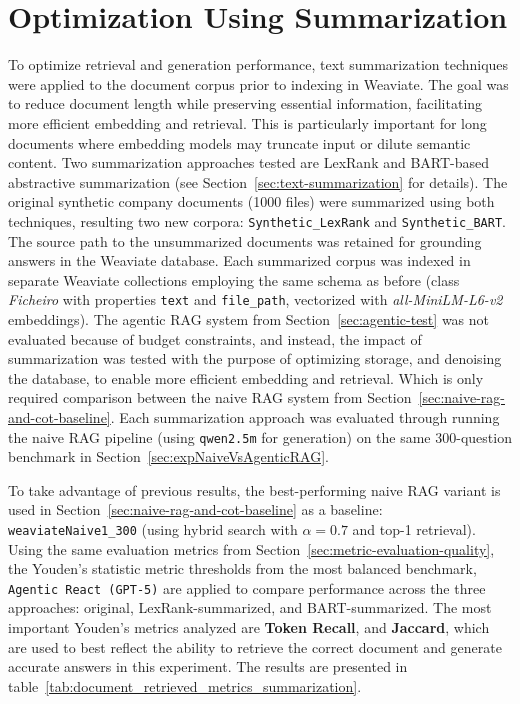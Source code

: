 \section{Optimization Using Summarization}
To optimize retrieval and generation performance, text summarization techniques were applied to the document corpus prior to indexing in Weaviate. The goal was to reduce document length while preserving essential information, facilitating more efficient embedding and retrieval.
This is particularly important for long documents where embedding models may truncate input or dilute semantic content.
Two summarization approaches tested are LexRank and BART-based abstractive summarization (see Section~\ref{sec:text-summarization} for details).
The original synthetic company documents (1000 files) were summarized using both techniques, resulting two new corpora: \texttt{Synthetic\_LexRank} and \texttt{Synthetic\_BART}. The source path to the unsummarized documents was retained for grounding answers in the Weaviate database.
Each summarized corpus was indexed in separate Weaviate collections employing the same schema as before (class \textit{Ficheiro} with properties \texttt{text} and \texttt{file\_path}, vectorized with \textit{all-MiniLM-L6-v2} embeddings). The agentic RAG system from Section~\ref{sec:agentic-test} was not evaluated because of budget constraints, and instead, the impact of summarization was tested with the purpose of optimizing storage, and denoising the database, to enable more efficient embedding and retrieval. Which is only required comparison between the naive RAG system from Section~\ref{sec:naive-rag-and-cot-baseline}.
Each summarization approach was evaluated through running the naive RAG pipeline (using \texttt{qwen2.5m} for generation) on the same 300-question benchmark in Section~\ref{sec:expNaiveVsAgenticRAG}. 

To take advantage of previous results, the best-performing naive RAG variant is used in Section~\ref{sec:naive-rag-and-cot-baseline} as a baseline: \texttt{weaviateNaive1\_300} (using hybrid search with \(\alpha=0.7\) and top-1 retrieval). Using the same evaluation metrics from Section~\ref{sec:metric-evaluation-quality}, the Youden's statistic metric thresholds from the most balanced benchmark, \texttt{Agentic React (\gls{GPT}-5)} are applied to compare performance across the three approaches: original, LexRank-summarized, and BART-summarized. The most important Youden's metrics analyzed are \textbf{Token Recall}, and \textbf{Jaccard}, which are used to best reflect the ability to retrieve the correct document and generate accurate answers in this experiment.
The results are presented in table~\ref{tab:document_retrieved_metrics_summarization}.

